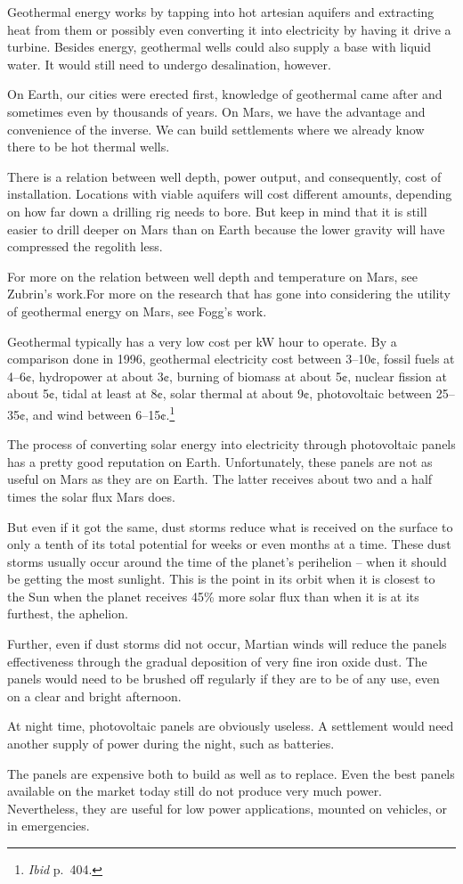 Geothermal energy works by tapping into hot artesian aquifers and extracting heat from them or possibly even converting it into electricity by having it drive a turbine. Besides energy, geothermal wells could also supply a base with liquid water. It would still need to undergo desalination, however.

On Earth, our cities were erected first, knowledge of geothermal came after and sometimes even by thousands of years. On Mars, we have the advantage and convenience of the inverse. We can build settlements where we already know there to be hot thermal wells.

There is a relation between well depth, power output, and consequently, cost of installation. Locations with viable aquifers will cost different amounts, depending on how far down a drilling rig needs to bore. But keep in mind that it is still easier to drill deeper on Mars than on Earth because the lower gravity will have compressed the regolith less.

For more on the relation between well depth and temperature on Mars, see Zubrin's work. For more on the research that has gone into considering the utility of geothermal energy on Mars, see Fogg's work.\footnotecite[fogg1996]

Geothermal typically has a very low cost per kW hour to operate. By a comparison done in 1996, geothermal electricity cost between 3--10¢, fossil fuels at 4--6¢, hydropower at about 3¢, burning of biomass at about 5¢, nuclear fission at about 5¢, tidal at least at 8¢, solar thermal at about 9¢, photovoltaic between 25--35¢, and wind between 6--15¢.\footnote{{\it Ibid} p.~404.}

The process of converting solar energy into electricity through photovoltaic panels has a pretty good reputation on Earth. Unfortunately, these panels are not as useful on Mars as they are on Earth. The latter receives about two and a half times the solar flux Mars does.

But even if it got the same, dust storms reduce what is received on the surface to only a tenth of its total potential for weeks or even months at a time. These dust storms usually occur around the time of the planet's perihelion -- when it should be getting the most sunlight. This is the point in its orbit when it is closest to the Sun when the planet receives 45\% more solar flux than when it is at its furthest, the aphelion. 

Further, even if dust storms did not occur, Martian winds will reduce the panels effectiveness through the gradual deposition of very fine iron oxide dust. The panels would need to be brushed off regularly if they are to be of any use, even on a clear and bright afternoon.

At night time, photovoltaic panels are obviously useless. A settlement would need another supply of power during the night, such as batteries.

The panels are expensive both to build as well as to replace. Even the best panels available on the market today still do not produce very much power. Nevertheless, they are useful for low power applications, mounted on vehicles, or in emergencies.

